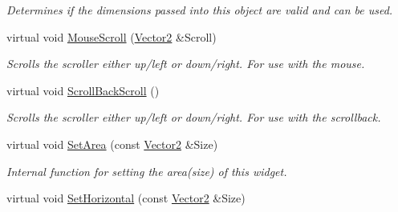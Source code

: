 \begin{DoxyCompactItemize}
\begin{DoxyCompactList}\small\item\em Determines if the dimensions passed into this object are valid and can be used. \item\end{DoxyCompactList}\item 
\hypertarget{classMezzanine_1_1UI_1_1Scrollbar_a481a901088a9802b47160d0106384970}{
virtual void \hyperlink{classMezzanine_1_1UI_1_1Scrollbar_a481a901088a9802b47160d0106384970}{MouseScroll} (\hyperlink{classMezzanine_1_1Vector2}{Vector2} \&Scroll)}
\label{classMezzanine_1_1UI_1_1Scrollbar_a481a901088a9802b47160d0106384970}

\begin{DoxyCompactList}\small\item\em Scrolls the scroller either up/left or down/right. For use with the mouse. \item\end{DoxyCompactList}\item 
\hypertarget{classMezzanine_1_1UI_1_1Scrollbar_afe4f632466ab594d9f87487bcebf8a88}{
virtual void \hyperlink{classMezzanine_1_1UI_1_1Scrollbar_afe4f632466ab594d9f87487bcebf8a88}{ScrollBackScroll} ()}
\label{classMezzanine_1_1UI_1_1Scrollbar_afe4f632466ab594d9f87487bcebf8a88}

\begin{DoxyCompactList}\small\item\em Scrolls the scroller either up/left or down/right. For use with the scrollback. \item\end{DoxyCompactList}\item 
\hypertarget{classMezzanine_1_1UI_1_1Scrollbar_ac068cc052b67f8b6d9c06940c64082d3}{
virtual void \hyperlink{classMezzanine_1_1UI_1_1Scrollbar_ac068cc052b67f8b6d9c06940c64082d3}{SetArea} (const \hyperlink{classMezzanine_1_1Vector2}{Vector2} \&Size)}
\label{classMezzanine_1_1UI_1_1Scrollbar_ac068cc052b67f8b6d9c06940c64082d3}

\begin{DoxyCompactList}\small\item\em Internal function for setting the area(size) of this widget. \item\end{DoxyCompactList}\item 
\hypertarget{classMezzanine_1_1UI_1_1Scrollbar_a0a09557bbb29ed29fbdfd9bb149c4002}{
virtual void \hyperlink{classMezzanine_1_1UI_1_1Scrollbar_a0a09557bbb29ed29fbdfd9bb149c4002}{SetHorizontal} (const \hyperlink{classMezzanine_1_1Vector2}{Vector2} \&Size)}
\label{classMezzanine_1_1UI_1_1Scrollbar_a0a09557bbb29ed29fbdfd9bb149c4002}


\end{DoxyCompactItemize}

